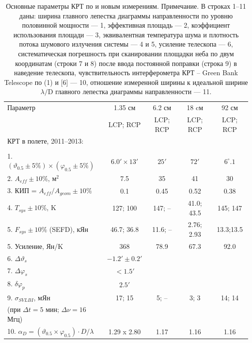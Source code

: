 \begin{table}
\caption{Основные параметры КРТ по \cite{Kardashev_2013_rus} и новым измерениям.
\tiny{Примечание. В строках 1--11 даны: ширина главного лепестка диаграммы направленности по уровню
половинной мощности --- 1, эффективная площадь --- 2, коэффициент использования площади --- 3,
эквивалентная температура шума и плотность потока шумового излучения системы --- 4 и 5, усиление
телескопа --- 6, систематическая погрешность при сканировании площадки неба
по двум координатам (строки 7 и 8) после ввода постоянной поправки (строка 9) в наведение телескопа,
чувствительность интерферометра КРТ – Green Bank Telescope по (1) и [6] --- 10, отношение
измеренной ширины к идеальной ширине $\lambda/\text{D}$ главного лепестка диаграммы направленности
--- 11.}}
\bigskip
\label{tab:srt_params3}
\centering
    \begin{SingleSpace}
    \tiny
        \begin{tabular}{lcccc}
        \toprule
Параметр              & 1.35 см  & 6.2 см   & 18 cм    & 92 см\\
                      & LCP; RCP & LCP; RCP & LCP; RCP & LCP; RCP\\

        \midrule
КРТ в полете, 2011--2013: & & & &\\
                       & & & &\\
1. $(\vartheta_{0.5} \pm 5 \%) \times (\varphi_{0.5} \pm 5 \%)$ & $6.0' \times 13'$ & $25'$ &$72'$
 & $6^\circ.1$ \\
2. $A_{eff} \pm 10\%$, м$^2$                  & 7.5        & 35     & 41         & 30\\
3. КИП = $A_{eff}/A_{geom} \pm 10\%$          & 0.1        & 0.45   & 0.52       & 0.38\\
4. $T_{sys} \pm 10\%$, K                      & 127; 100   & 147;  -- & 41.0; 43.5 & 145; 147\\
5. $F_{sys} \pm 10\%$ (SEFD), кЯн             & 46.7; 36.8 & 11.6; --& 2.76; 2.93 & 13.3;13.5\\
5. Усиление, Ян/K                             & 368        &  78.9  & 67.3       & 92.0     \\
6. $\Delta \vartheta_s$  & $-1.2' \pm 0.2'$    & & & \\
7. $\Delta \varphi_s$    & $< 1.5'$            & & & \\
8. $\delta \varphi_p$    & $2.5'$              & & & \\
9. $\sigma_{SVLBI}$, мЯн          & 17; 15 &  5; --  & 3; 3    & 14; 14\\
   (при $\Delta t = 5$ мин; $\Delta \nu = 16$ Мгц)            &        &        &         &
\\
10. $\alpha_D = (\vartheta_{0.5} \times \varphi_{0.5}) \cdot D / \lambda$ &  1.29 x 2.80 & 1.17 &
1.16 & 1.16\\
        \bottomrule
        \end{tabular}
    \end{SingleSpace}
\end{table}

